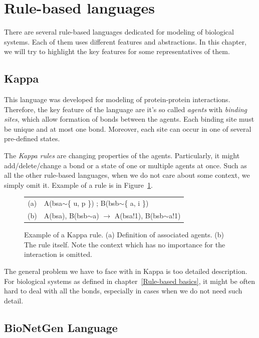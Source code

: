 \documentclass[12pt]{fithesis2}
\begin{document}
\section{Rule-based languages}

There are several rule-based languages dedicated for modeling of biological systems. Each of them uses different features and abstractions. In this chapter, we will try to highlight the key features for some representatives of them.

\subsection{Kappa}
\label{kappa}

This language was developed for modeling of protein-protein interactions. Therefore, the key feature of the language are it's so called \textit{agents} with \textit{binding sites}, which allow formation of bonds between the agents. Each binding site must be unique and at most one bond. Moreover, each site can occur in one of several pre-defined states.

The \textit{Kappa rules} are changing properties of the agents. Particularly, it might add/delete/change a bond or a state of one or multiple agents at once. Such as all the other rule-based languages, when we do not care about some context, we simply omit it. Example of a rule is in Figure~\ref{kappa-rule}.

\begin{figure}
\begin{center}
\begin{tabular}{c l}
(a) & A(bsa$\sim$\{ u, p \}) ; B(bsb$\sim$\{ a, i \}) \\
(b) & A(bsa), B(bsb$\sim$a) $\rightarrow$ A(bsa!1), B(bsb$\sim$a!1) \\
\end{tabular}
\end{center}
\caption{Example of a Kappa rule. (a) Definition of associated agents. (b) The rule itself. Note the context which has no importance for the interaction is omitted.}\label{kappa-rule}
\end{figure}

The general problem we have to face with in Kappa is too detailed description. For biological systems as defined in chapter~\ref{Rule-based basics}, it might be often hard to deal with all the bonds, especially in cases when we do not need such detail.

\subsection{BioNetGen Language}
\label{bngl}
\end{document}
